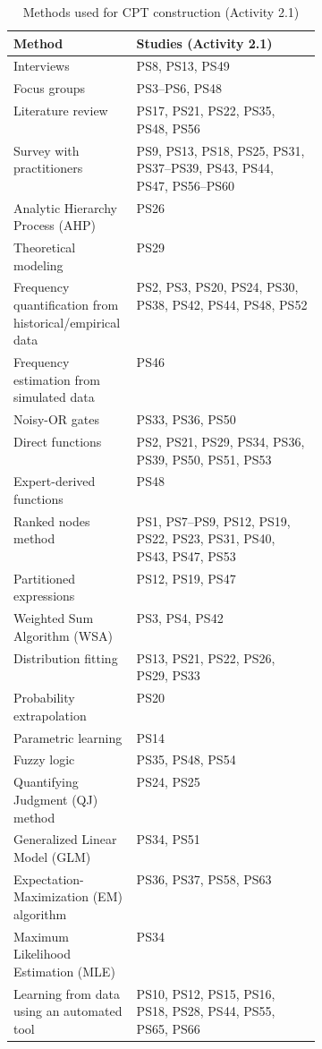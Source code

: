 \begin{table}[t]
\caption{Methods used for CPT construction (Activity 2.1)}
\label{tab:app_methods_cpt_construction}
\centering
\small
\setlength{\tabcolsep}{4pt}
\renewcommand{\arraystretch}{1.15}
\begin{tabularx}{\linewidth}{@{}>{\raggedright\arraybackslash}p{0.40\linewidth}
                            >{\raggedright\arraybackslash}X@{}}
\toprule
\textbf{Method} & \textbf{Studies (Activity 2.1)} \\
\midrule
Interviews & PS8, PS13, PS49 \\
Focus groups & PS3--PS6, PS48 \\
Literature review & PS17, PS21, PS22, PS35, PS48, PS56 \\
Survey with practitioners & PS9, PS13, PS18, PS25, PS31, PS37--PS39, PS43, PS44, PS47, PS56--PS60 \\
Analytic Hierarchy Process (AHP) & PS26 \\
Theoretical modeling & PS29 \\
Frequency quantification from historical/empirical data & PS2, PS3, PS20, PS24, PS30, PS38, PS42, PS44, PS48, PS52 \\
Frequency estimation from simulated data & PS46 \\
Noisy-OR gates & PS33, PS36, PS50 \\
Direct functions & PS2, PS21, PS29, PS34, PS36, PS39, PS50, PS51, PS53 \\
Expert-derived functions & PS48 \\
Ranked nodes method & PS1, PS7--PS9, PS12, PS19, PS22, PS23, PS31, PS40, PS43, PS47, PS53 \\
Partitioned expressions & PS12, PS19, PS47 \\
Weighted Sum Algorithm (WSA) & PS3, PS4, PS42 \\
Distribution fitting & PS13, PS21, PS22, PS26, PS29, PS33 \\
Probability extrapolation & PS20 \\
Parametric learning & PS14 \\
Fuzzy logic & PS35, PS48, PS54 \\
Quantifying Judgment (QJ) method & PS24, PS25 \\
Generalized Linear Model (GLM) & PS34, PS51 \\
Expectation-Maximization (EM) algorithm & PS36, PS37, PS58, PS63 \\
Maximum Likelihood Estimation (MLE) & PS34 \\
Learning from data using an automated tool & PS10, PS12, PS15, PS16, PS18, PS28, PS44, PS55, PS65, PS66 \\
\bottomrule
\end{tabularx}
\end{table}


